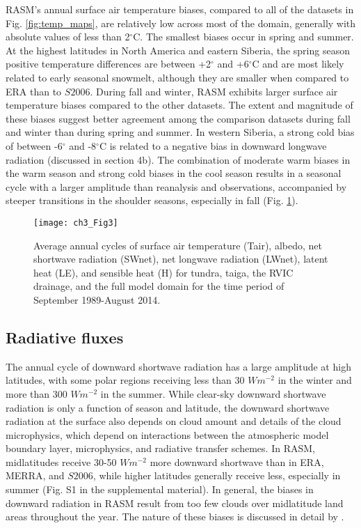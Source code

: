 RASM's annual surface air temperature biases, compared to all of the datasets in Fig. \ref{fig:temp_maps}, are relatively low across most of the domain, generally with absolute values of less than 2$^{\circ}$C.
The smallest biases occur in spring and summer.
At the highest latitudes in North America and eastern Siberia, the spring season positive temperature differences are between +2$^{\circ}$ and +6$^{\circ}$C and are most likely related to early seasonal snowmelt, although they are smaller when compared to ERA than to $S2006$.
During fall and winter, RASM exhibits larger surface air temperature biases compared to the other datasets.
The extent and magnitude of these biases suggest better agreement among the comparison datasets during fall and winter than during spring and summer.
In western Siberia, a strong cold bias of between -6$^{\circ}$ and -8$^{\circ}$C is related to a negative bias in downward longwave radiation (discussed in section 4b).
The combination of moderate warm biases in the warm season and strong cold biases in the cool season results in a seasonal cycle with a larger amplitude than reanalysis and observations, accompanied by steeper transitions in the shoulder seasons, especially in fall (Fig. \ref{fig:energy_cycle}).

\begin{figure}
  \centering
  \texttt{[image: ch3\_Fig3]}
  \caption{Average annual cycles of surface air temperature (Tair), albedo, net shortwave radiation (SWnet), net longwave radiation (LWnet), latent heat (LE), and sensible heat (H) for tundra, taiga, the RVIC drainage, and the full model domain for the time period of September 1989-August 2014.}
  \label{fig:energy_cycle}
\end{figure}

\subsection{Radiative fluxes}

The annual cycle of downward shortwave radiation has a large amplitude at high latitudes, with some polar regions receiving less than 30 $W m^{-2}$ in the winter and more than 300 $W m^{-2}$ in the summer.
While clear-sky downward shortwave radiation is only a function of season and latitude, the downward shortwave radiation at the surface also depends on cloud amount and details of the cloud microphysics, which depend on interactions between the atmospheric model boundary layer, microphysics, and radiative transfer schemes.
In RASM, midlatitudes receive 30-50 $W m^{-2}$ more downward shortwave than in ERA, MERRA, and $S2006$, while higher latitudes generally receive less, especially in summer (Fig. S1 in the supplemental material).
In general, the biases in downward radiation in RASM result from too few clouds over midlatitude land areas throughout the year.
The nature of these biases is discussed in detail by \citet{Cassano_2016}.

